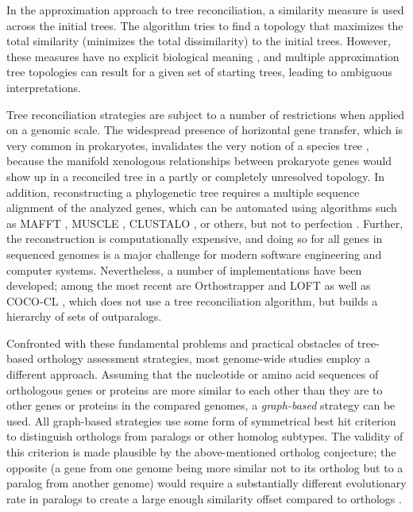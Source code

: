 

In the approximation approach to tree reconciliation, a similarity measure is
used across the initial trees. The algorithm tries to find a topology that
maximizes the total similarity (minimizes the total dissimilarity) to the
initial trees. However, these measures have no explicit biological meaning
\citep{mirkin1995}, and multiple approximation tree topologies can result for a
given set of starting trees, leading to ambiguous interpretations. 

Tree reconciliation strategies are subject to a number of restrictions when
applied on a genomic scale. The widespread presence of horizontal gene transfer,
which is very common in prokaryotes, invalidates the very notion of a species
tree \citep{doolittle2000}, because the manifold xenologous relationships
between prokaryote genes would show up in a reconciled tree in a partly or
completely unresolved topology.  In addition, reconstructing a phylogenetic tree
requires a multiple sequence alignment of the analyzed genes, which can be
automated using algorithms such as MAFFT \citep{katoh2005}, MUSCLE
\citep{edgar2004}, CLUSTALO \cite{sievers2011}, or others, but not to perfection
\citep{thompson2011}.  Further, the reconstruction is computationally expensive,
and doing so for all genes in sequenced genomes is a major challenge for modern
software engineering and computer systems. Nevertheless, a number of
implementations have been developed; among the most recent are Orthostrapper
\citep{jothi2006} and LOFT \citep{van_der_heijden2007} as well as \mbox{COCO-CL}
\citep{storm2002}, which does not use a tree reconciliation algorithm, but
builds a hierarchy of sets of outparalogs. 

Confronted with these fundamental problems and practical obstacles of tree-based
orthology assessment strategies, most genome-wide studies employ a different
approach. Assuming that the nucleotide or amino acid sequences of orthologous
genes or proteins are more similar to each other than they are to other genes or
proteins in the compared genomes, a \emph{graph-based} strategy can be used. All
graph-based strategies use some form of symmetrical best hit criterion to
distinguish orthologs from paralogs or other homolog subtypes. The validity of
this criterion is made plausible by the above-mentioned ortholog conjecture; the
opposite (a gene from one genome being more similar not to its ortholog but to a
paralog from another genome) would require a substantially different
evolutionary rate in paralogs to create a large enough similarity offset
compared to orthologs \citep{koonin2005}.

